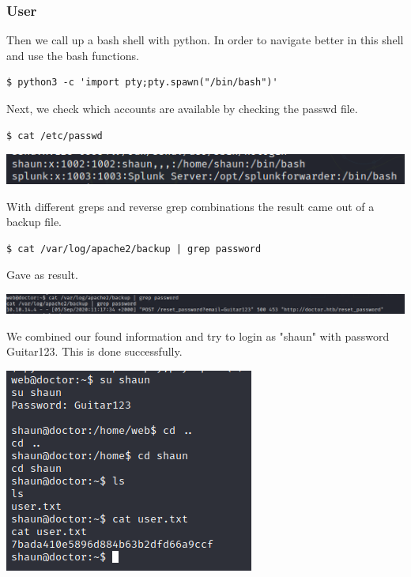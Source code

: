 \documentclass[../main.tex]{subfiles}
\begin{document}
\subsubsection{User}

Then we call up a bash shell with python. In order to navigate better in this shell and use the bash functions.

\begin{lstlisting}
$ python3 -c 'import pty;pty.spawn("/bin/bash")'
\end{lstlisting}

Next, we check which accounts are available by checking the passwd file.

\begin{lstlisting}
$ cat /etc/passwd
\end{lstlisting}

\includegraphics[width=\linewidth]{images/Nicolai/doctor_cat_etcpassw.png}

With different greps and reverse grep combinations the result came out of a backup file.

\begin{lstlisting}
$ cat /var/log/apache2/backup | grep password
\end{lstlisting}
Gave as result.

\includegraphics[width=\linewidth]{images/Nicolai/doctor_apache_passwd.png}

We combined our found information and try to login as "shaun" with password Guitar123. This is done successfully.

\includegraphics[width=0.7\linewidth]{images/Nicolai/doctor_user_flag.png}
\clearpage
\end{document}
